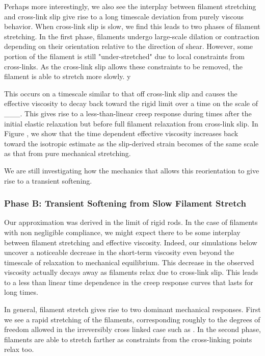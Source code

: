 \documentclass[pre,reprint]{revtex4-1}
\begin{document}
Perhaps more interestingly, we also see the interplay between filament stretching and cross-link slip give rise to a long timescale deviation from purely viscous behavior.  When cross-link slip is slow, we find this leads to two phases of filament stretching.  In the first phase, filaments undergo large-scale dilation or contraction depending on their orientation relative to the direction of shear.  However, some portion of the filament is still "under-stretched" due to local constraints from cross-links.  As the cross-link slip allows these constraints to be removed, the filament is able to stretch more slowly. y

This occurs on a timescale similar to that off cross-link slip and causes the effective viscosity to decay back toward the rigid limit over a time on the scale of \_\_\_.  This gives rise to a less-than-linear creep response during times after the initial elastic relaxation but before full filament relaxation from cross-link slip.  In Figure , we show that the time dependent effective viscosity increases back toward the isotropic estimate as the slip-derived strain becomes of the same scale as that from pure mechanical stretching.

We are still investigating how the mechanics that allows this reorientation to give rise to a transient softening.

\subsubsection{Phase B: Transient Softening from Slow Filament Stretch}
\label{sec:compliant}

Our approximation was derived in the limit of rigid rods.  In the case of filaments with non negligible compliance, we might expect there to be some interplay between filament stretching and effective viscosity.  Indeed, our simulations below uncover a noticeable decrease in the short-term viscosity even beyond the timescale of relaxation to mechanical equilibrium.  This decrease in the observed viscosity actually decays away as filaments relax due to cross-link slip.  This leads to a less than linear time dependence in the creep response curves that lasts for long times.  

In general, filament stretch gives rise to two dominant mechanical responses.  First we see a rapid stretching of the filaments, corresponding roughly to the degrees of freedom allowed in the irreversibly cross linked case such as \cite{theo_hlm}.  In the second phase, filaments are able to stretch farther as constraints from the cross-linking points relax too.
\end{document}
